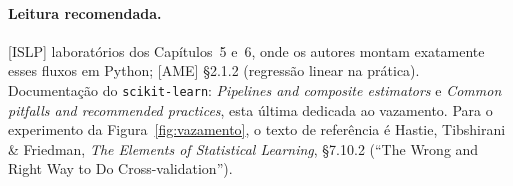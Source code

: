 \documentclass[11pt,a4paper]{article}
\begin{document}
\paragraph{Leitura recomendada.} [ISLP] laboratórios dos Capítulos~5 e~6, onde os
autores montam exatamente esses fluxos em Python; [AME] §2.1.2 (regressão linear na
prática). Documentação do \texttt{scikit-learn}: \emph{Pipelines and composite
estimators} e \emph{Common pitfalls and recommended practices}, esta última dedicada
ao vazamento. Para o experimento da Figura~\ref{fig:vazamento}, o texto de
referência é Hastie, Tibshirani \& Friedman, \emph{The Elements of Statistical
Learning}, §7.10.2 (``The Wrong and Right Way to Do Cross-validation'').
\end{document}
